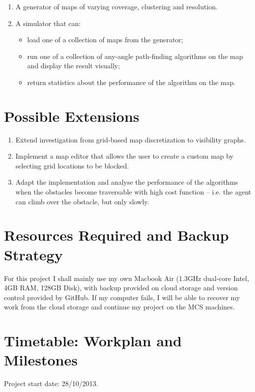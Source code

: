 \begin{enumerate}
\item A generator of maps of varying coverage, clustering and resolution.
\item A simulator that can:
\begin{itemize}
\item load one of a collection of maps from the generator;
\item run one of a collection of any-angle path-finding algorithms on the map and display the result visually;
\item return statistics about the performance of the algorithm on the map.
\end{itemize}
\end{enumerate}

\section*{Possible Extensions}

\begin{enumerate}
\item Extend investigation from grid-based map discretization to visibility graphs.

\item Implement a map editor that allows the user to create a custom map by selecting grid locations to be blocked.

\item Adapt the implementation and analyse the performance of the algorithms when the obstacles become traversable with high cost function -- i.e. the agent can climb over the obstacle, but only slowly.

\end{enumerate}

\section*{Resources Required and Backup Strategy}

For this project I shall mainly use my own Macbook Air (1.3GHz dual-core Intel, 4GB RAM, 128GB Disk), with backup provided on cloud storage and version control provided by GitHub. If my computer fails, I will be able to recover my work from the cloud storage and continue my project on the MCS machines.

\vfil

\section*{Timetable: Workplan and Milestones}
Project start date: 28/10/2013.\\

